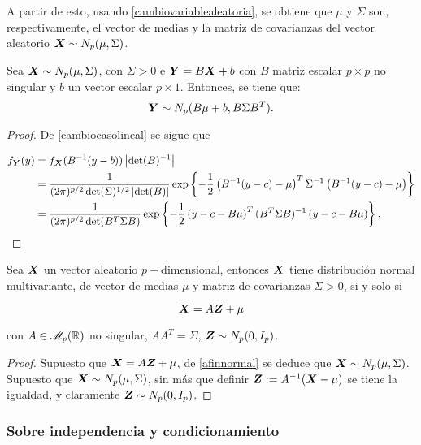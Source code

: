 A partir de esto, usando \ref{cambiovariablealeatoria}, se obtiene que $\mu$ y $\Sigma$ son, respectivamente, el vector de medias y la matriz de covarianzas del vector aleatorio $\boldsymbol{X} \sim N_p(\mu,\Sigma)$.


\begin{nprop} \label{afinnormal}
  Sea $\boldsymbol{X} \sim N_p(\mu,\Sigma)$, con $\Sigma > 0$ e $\boldsymbol{Y} = B\boldsymbol{X}+b$ con $B$ matriz escalar $p\times p$ no singular y $b$ un vector escalar $p\times 1$. Entonces, se tiene que:
  \[
     \boldsymbol{Y} \sim N_p(B\mu+b, B \Sigma B^T)
  .\]
\end{nprop}

\begin{proof}
  De \ref{cambiocasolineal} se sigue que

  \[
  \begin{split}
    f_{\boldsymbol{Y}}(y) & = f_{\boldsymbol{X}}(B^{-1}(y-b))\left|\det(B)^{-1}\right| \\
    & = \frac{1}{(2\pi)^{p/2} \det(\Sigma)^{1/2} \left|\det(B)\right|}
    \exp\left\{ -\frac{1}{2} \left(B^{-1}(y-c) - \mu\right)^T \Sigma^{-1} \left(B^{-1}(y-c) - \mu \right) \right\} \\
    & = \frac{1}{(2\pi)^{p/2} \det(B^T\Sigma B)}
    \exp\left\{ -\frac{1}{2} \left(y-c - B\mu\right)^T (B^T\Sigma B)^{-1} \left(y - c - B\mu \right) \right\}.
  \end{split}
  \]
\end{proof}

\begin{nth} \label{posvar:car-i}
  Sea $\boldsymbol{X}$ un vector aleatorio $p-$dimensional, entonces $\boldsymbol{X}$ tiene distribución normal multivariante, de vector de medias $\mu$ y matriz de covarianzas $\Sigma > 0$, si y solo si
  
  \[
    \boldsymbol{X} = A\boldsymbol{Z} + \mu
  \]
    
con $A\in \mathscr{M}_{p}(\mathbb{R})$ no singular, $AA^T = \Sigma$, $\boldsymbol{Z} \sim N_p(0,I_p)$.
\end{nth}

\begin{proof}
  Supuesto que $\boldsymbol{X} = A\boldsymbol{Z} + \mu$, de \ref{afinnormal} se deduce que $\boldsymbol{X} \sim N_p(\mu, \Sigma)$. Supuesto que $\boldsymbol{X} \sim N_p(\mu, \Sigma)$,
  sin más que definir $\boldsymbol{Z} := A^{-1}(\boldsymbol{X} - \mu)$ se tiene la igualdad, y claramente $\boldsymbol{Z} \sim N_p(0, I_p)$.
\end{proof}

\subsubsection{Sobre independencia y condicionamiento}

